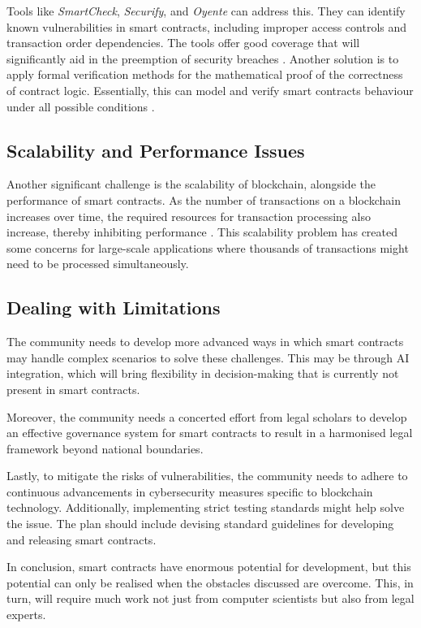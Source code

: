 Tools like \textit{SmartCheck}, \textit{Securify}, and \textit{Oyente} can address this. They can identify known vulnerabilities in smart contracts, including improper access controls and transaction order dependencies. The tools offer good coverage that will significantly aid in the preemption of security breaches \cite{ZhouEtAl2022}. Another solution is to apply formal verification methods for the mathematical proof of the correctness of contract logic. Essentially, this can model and verify smart contracts behaviour under all possible conditions \cite{ZhouEtAl2022}.

\subsection{Scalability and Performance Issues}

Another significant challenge is the scalability of blockchain, alongside the performance of smart contracts. As the number of transactions on a blockchain increases over time, the required resources for transaction processing also increase, thereby inhibiting performance \cite{Scherer2017, UllahEtAl2023}. This scalability problem has created some concerns for large-scale applications where thousands of transactions might need to be processed simultaneously.

\subsection{Dealing with Limitations}

The community needs to develop more advanced ways in which smart contracts may handle complex scenarios to solve these challenges. This may be through AI integration, which will bring flexibility in decision-making that is currently not present in smart contracts.

Moreover, the community needs a concerted effort from legal scholars to develop an effective governance system for smart contracts to result in a harmonised legal framework beyond national boundaries.

Lastly, to mitigate the risks of vulnerabilities, the community needs to adhere to continuous advancements in cybersecurity measures specific to blockchain technology. Additionally, implementing strict testing standards might help solve the issue. The plan should include devising standard guidelines for developing and releasing smart contracts.

In conclusion, smart contracts have enormous potential for development, but this potential can only be realised when the obstacles discussed are overcome. This, in turn, will require much work not just from computer scientists but also from legal experts.

